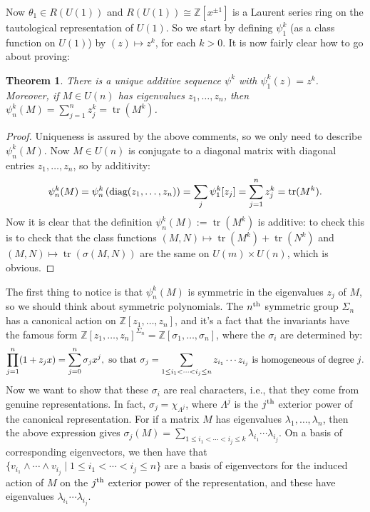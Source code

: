 \documentclass{article}
\newcommand{\Z}{\mathbb{Z}}
\DeclareMathOperator{\tr}{tr}
\newtheorem{thm}{Theorem}[section]
\begin{document}
Now $\theta_1 \in R(U(1))$ and $R(U(1)) \cong \Z[x^{\pm 1}]$ is a Laurent series ring on the tautological representation of $U(1)$.  So we start by defining $\psi_1^k$ (as a class function on $U(1)$) by $(z)\mapsto z^k$, for each $k > 0$.  It is now fairly clear how to go about proving:
\begin{thm}
There is a unique additive sequence $\psi^k$ with $\psi^k_1(z) = z^k$. Moreover, if $M\in U(n)$ has eigenvalues $z_1,\ldots,z_n$, then $\psi_n^k(M)=\sum_{j=1}^n z^k_j=\tr(M^k)$.
\end{thm}
\begin{proof}
Uniqueness is assured by the above comments, so we only need to describe $\psi_n^k(M)$. Now $M \in U(n)$ is conjugate to a diagonal matrix with diagonal entries $z_1, \ldots, z_n$, so by additivity:
\[\psi^k_n(M) = \psi^k_n \left( \textup{diag}(z_1,\ldots,z_n)\right) = \sum_j \psi^k_1 [z_j] = \sum_{j=1}^n z_j^k = \tr(M^k).\]
Now it is clear that the definition $\psi^k_n(M):=\tr(M^k)$ is additive: to check this is to check that the class functions $(M,N)\mapsto \tr(M^k)+\tr(N^k)$ and $(M,N)\mapsto \tr(\sigma(M,N))$ are the same on $U(m)\times U(n)$, which is obvious.
\end{proof}
The first thing to notice is that $\psi^k_n(M)$ is symmetric in the eigenvalues $z_j$ of $M$, so we should think about symmetric polynomials. The $n^\textup{th}$ symmetric group $\Sigma_n$ has a canonical action on $\Z[z_1, \ldots, z_n]$, and it's a fact that the invariants have the famous form $\Z[z_1, \ldots, z_n]^{\Sigma_n} = \Z[\sigma_1, \ldots, \sigma_n]$, where the $\sigma_i$ are determined by:
\[\prod_{j=1}^n (1+z_j x) = \sum_{j=0}^n \sigma_j x^j,\textup{ so that }
\sigma_j = \sum_{ 1\leq i_1 < \cdots < i_j\leq n }z_{i_1}\cdots z_{i_j}\text{ is homogeneous of degree $j$.}\]
Now we want to show that these $\sigma_i$ are real characters, i.e., that they come from genuine representations.  In fact, $\sigma_j = \chi_{\Lambda^j}$, where $\Lambda^j$ is the $j^\textup{th}$ exterior
power of the canonical representation.  
For if a matrix $M$ has eigenvalues $\lambda_1, \ldots, \lambda_n$, then the above expression gives $\sigma_j(M) = \sum_{1 \le i_1 < \cdots < i_j \le k} \lambda_{i_1} \cdots \lambda_{i_j}$.  On a basis of corresponding eigenvectors, we then have that $\{v_{i_1} \wedge \cdots \wedge v_{i_j} \mid 1 \le i_1 < \cdots < i_j \le n\}$ are a basis of eigenvectors for the induced action of $M$ on the $j^\textup{th}$ exterior power of the representation, and these have eigenvalues $\lambda_{i_1} \cdots \lambda_{i_j}$.
\end{document}
